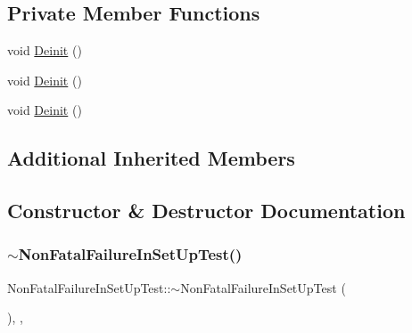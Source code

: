 \subsection*{Private Member Functions}
\begin{DoxyCompactItemize}
\item 
void \mbox{\hyperlink{class_non_fatal_failure_in_set_up_test_a86ecc924c67807b75e5ef5e89d8277ce}{Deinit}} ()
\item 
void \mbox{\hyperlink{class_non_fatal_failure_in_set_up_test_a86ecc924c67807b75e5ef5e89d8277ce}{Deinit}} ()
\item 
void \mbox{\hyperlink{class_non_fatal_failure_in_set_up_test_a86ecc924c67807b75e5ef5e89d8277ce}{Deinit}} ()
\end{DoxyCompactItemize}
\subsection*{Additional Inherited Members}


\subsection{Constructor \& Destructor Documentation}
\mbox{\label{class_non_fatal_failure_in_set_up_test_a005ae391cd3113deed2e7eb6ccb20590}} 
\subsubsection{\texorpdfstring{$\sim$NonFatalFailureInSetUpTest()}{~NonFatalFailureInSetUpTest()}\hspace{0.1cm}{\footnotesize\ttfamily [1/3]}}
{\footnotesize\ttfamily Non\+Fatal\+Failure\+In\+Set\+Up\+Test\+::$\sim$\+Non\+Fatal\+Failure\+In\+Set\+Up\+Test (\begin{DoxyParamCaption}{ }\end{DoxyParamCaption})\hspace{0.3cm}{\ttfamily [inline]}, {\ttfamily [override]}, {\ttfamily [protected]}}

\mbox{\label{class_non_fatal_failure_in_set_up_test_a005ae391cd3113deed2e7eb6ccb20590}} 
